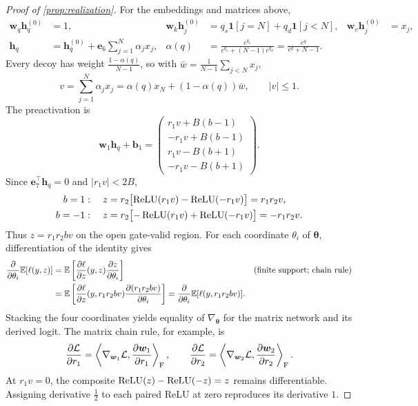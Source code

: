 \begin{proof}[Proof of \cref{prop:realization}]
For the embeddings and matrices above,
\begin{align*}
 \bm w_q\bm h_q^{(0)}&=1,&
 \bm w_k\bm h_j^{(0)}&=q_s\mathbf1[j=N]+q_d\mathbf1[j<N],&
 \bm w_v\bm h_j^{(0)}&=x_j,\\
 \bm h_q&=\bm h_q^{(0)}+\bm e_6\sum_{j=1}^N \alpha_j x_j,&
 \alpha(q)&=\frac{e^{q_s}}{e^{q_s}+(N-1)e^{q_d}}
 =\frac{e^q}{e^q+N-1}.
\end{align*}
Every decoy has weight $\tfrac{1-\alpha(q)}{N-1}$, so with $\bar w=\tfrac{1}{N-1}\sum_{j<N}x_j$,
\[
 v=\sum_{j=1}^N \alpha_j x_j=\alpha(q)x_N+(1-\alpha(q))\bar w,\qquad |v|\le1.
\]
The preactivation is
\[
 \bm w_1\bm h_q+\bm b_1=
 \begin{pmatrix}
 r_1v+B(b-1)\\-r_1v+B(b-1)\\
 r_1v-B(b+1)\\-r_1v-B(b+1)
 \end{pmatrix}.
\]
Since $\bm e_7^\top\bm h_q=0$ and $|r_1v|<2B$,
\begin{align*}
 b=1:\quad z&=r_2\bigl[\operatorname{ReLU}(r_1v)-\operatorname{ReLU}(-r_1v)\bigr]=r_1r_2v,\\
 b=-1:\quad z&=r_2\bigl[-\operatorname{ReLU}(r_1v)+\operatorname{ReLU}(-r_1v)\bigr]=-r_1r_2v.
\end{align*}
Thus $z=r_1r_2b v$ on the open gate-valid region.
For each coordinate $\theta_i$ of $\bm\theta$, differentiation of the identity gives
\begin{align*}
 \frac{\partial }{\partial \theta_i}\mathbb E[\ell(y,z)]
 &=\mathbb E\left[\frac{\partial \ell}{\partial z}(y,z)\frac{\partial z}{\partial \theta_i}\right]&&\text{(finite support; chain rule)}\\
 &=\mathbb E\left[\frac{\partial \ell}{\partial z}(y,r_1r_2b v)\frac{\partial (r_1r_2b v)}{\partial \theta_i}\right]
 =\frac{\partial }{\partial \theta_i}\mathbb E[\ell(y,r_1r_2b v)].
\end{align*}
Stacking the four coordinates yields equality of $\nabla_{\bm\theta}$ for the matrix network and its derived logit.
The matrix chain rule, for example, is
\[
 \frac{\partial \mathcal L}{\partial r_1}=\left\langle\nabla_{\bm w_1}\mathcal L,\frac{\partial \bm w_1}{\partial r_1}\right\rangle_{\mathrm F},\qquad
 \frac{\partial \mathcal L}{\partial r_2}=\left\langle\nabla_{\bm w_2}\mathcal L,\frac{\partial \bm w_2}{\partial r_2}\right\rangle_{\mathrm F}.
\]
At $r_1v=0$, the composite $\operatorname{ReLU}(z)-\operatorname{ReLU}(-z)=z$ remains differentiable.
Assigning derivative $\tfrac{1}{2}$ to each paired ReLU at zero reproduces its derivative $1$.\qedhere
\end{proof}
